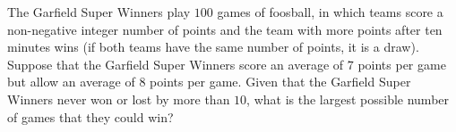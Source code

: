 The Garfield Super Winners play $100$ games of foosball, in which teams score a non-negative integer number of points and the team with more points after ten minutes wins (if both teams have the same number of points, it is a draw). Suppose that the Garfield Super Winners score an average of $7$ points per game but allow an average of $8$ points per game. Given that the Garfield Super Winners never won or lost by more than $10$, what is the largest possible number of games that they could win?